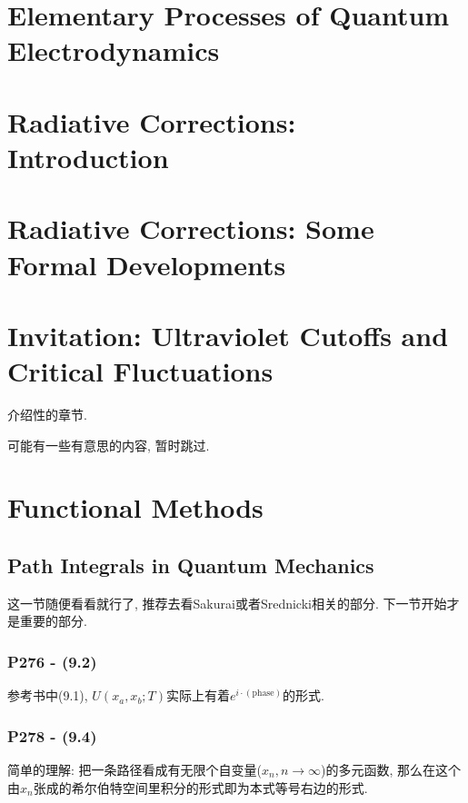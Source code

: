 \documentclass[cn,hazy,green,11pt,device=normal,chinesefont=founder]{elegantnote}
\begin{document}
\clearpage

\section{Elementary Processes of Quantum Electrodynamics}

\section{Radiative Corrections: Introduction}

\section{Radiative Corrections: Some Formal Developments}

\clearpage

\section{Invitation: Ultraviolet Cutoffs and Critical Fluctuations}

介绍性的章节. 

可能有一些有意思的内容, 暂时跳过. 

\clearpage

\section{Functional Methods}

\subsection{Path Integrals in Quantum Mechanics}

这一节随便看看就行了, 推荐去看Sakurai或者Srednicki相关的部分. 下一节开始才是重要的部分. 

\subsubsection{P276 - (9.2)}

参考书中(9.1), $U(x_a, x_b; T)$实际上有着$e^{i \cdot (\text{phase})}$的形式. 

\subsubsection{P278 - (9.4)}

\begin{remark}
  简单的理解: 把一条路径看成有无限个自变量($x_n, n \rightarrow \infty$)的多元函数, 那么在这个由$x_n$张成的希尔伯特空间里积分的形式即为本式等号右边的形式. 
\end{remark}
\end{document}
